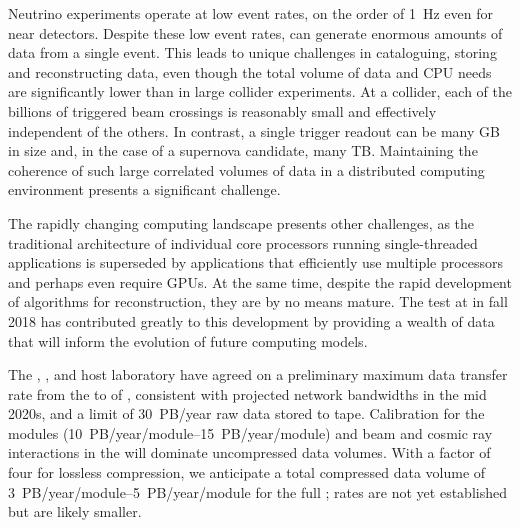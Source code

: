 Neutrino experiments operate at low event rates, on the order of \SI{1}{Hz} even for near detectors. 
Despite these low event rates, %
 can generate enormous amounts of data from a single event. %
This leads to unique challenges in cataloguing, storing and reconstructing data, even though the total volume of data and CPU needs are significantly lower than in large collider experiments.  At a collider, each of the billions of triggered beam crossings is reasonably small and  effectively independent of the others. In contrast, a single  trigger readout can be many GB in size and, in the case of a supernova candidate, many TB. Maintaining the coherence of such large correlated %
volumes of data in a distributed computing environment presents a significant challenge. %

The rapidly changing computing landscape presents other challenges, as 
the traditional  architecture of individual core processors running single-threaded applications %
is superseded by applications that efficiently use multiple processors and perhaps even require GPUs. At the same time, despite the rapid development of algorithms for  reconstruction, they are by no means mature. %
The  test at  in fall 2018 has contributed greatly to this development by providing a wealth of data that will inform the evolution of future  computing models.  %

The ,   ,  and host laboratory %
have agreed on a preliminary maximum data transfer rate from the  to  of \surffnalbw{}, consistent with projected network bandwidths in the mid 2020s, and a limit of \SI{30}{PB/year} raw data stored to tape. 
Calibration for the  modules (\SIrange{10}{15}{PB/year/module}) and beam and cosmic ray interactions in the  will dominate uncompressed data volumes.  With a  factor of four for lossless compression, we anticipate a total compressed data volume of \SIrange{3}{5}{PB/year/module} for the full ;  rates are not yet established but are likely smaller.   

